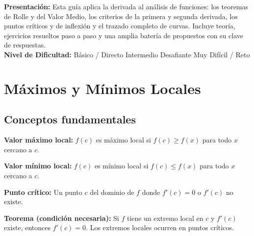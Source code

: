 \documentclass[12pt, letterpaper]{article}
\begin{document}

\vspace{4pt}
\begin{cuadroinfo}
  \small
  \textbf{Presentación:} Esta guía aplica la derivada al análisis de funciones: los teoremas de Rolle y del Valor Medio, los criterios de la primera y segunda derivada, los puntos críticos y de inflexión y el trazado completo de curvas. Incluye teoría, ejercicios resueltos paso a paso y una amplia batería de propuestos con su clave de respuestas.
  \\[4pt]
  \textbf{Nivel de Dificultad:}\quad
  \facil{} Básico / Directo \quad
  \medio{} Intermedio \quad
  \dificil{} Desafiante \quad
  \muyDificil{} Muy Difícil / Reto
\end{cuadroinfo}

\vspace{8pt}

\section{Máximos y Mínimos Locales}

\subsection{Conceptos fundamentales}

\begin{cuadroteoria}
  \textbf{Valor máximo local:} $f(c)$ es máximo local si $f(c) \geq f(x)$ para todo $x$ cercano a $c$.

  \textbf{Valor mínimo local:} $f(c)$ es mínimo local si $f(c) \leq f(x)$ para todo $x$ cercano a $c$.

  \textbf{Punto crítico:} Un punto $c$ del dominio de $f$ donde $f'(c) = 0$ o $f'(c)$ no existe.

  \textbf{Teorema (condición necesaria):} Si $f$ tiene un extremo local en $c$ y $f'(c)$ existe, entonces $f'(c) = 0$. Los extremos locales ocurren en puntos críticos.
\end{cuadroteoria}
\end{document}

